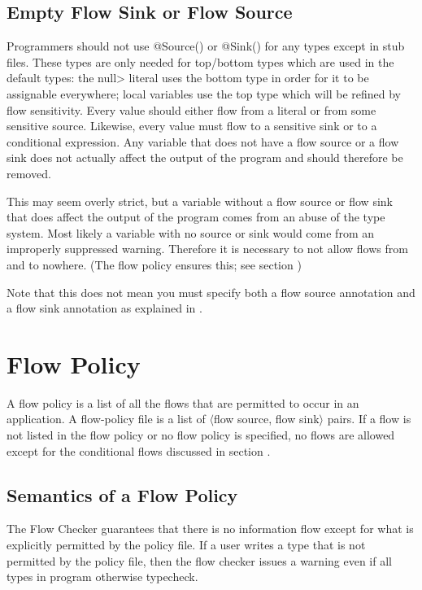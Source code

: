 \subsection{Empty Flow Sink or Flow Source\label{sec:emptyflow}}

Programmers should not use @Source(\ttcbs) or @Sink(\ttcbs) for
any types except in stub files.
These types are only needed for top/bottom types which are used in the
default types: the \<null> literal uses the bottom type in order for
it to be assignable everywhere; local variables use the top type which
will be refined by flow sensitivity.
Every value should either flow from a literal or from some sensitive
source.  Likewise, every value must flow to a sensitive sink or to a
conditional expression.  Any variable that does not have a flow source
or a flow sink does not actually affect the output of the program and
should therefore be removed.
  
This may seem overly strict, but a variable without a flow source or
flow sink that does affect the output of the program comes from an
abuse of the type system.  Most likely a variable with no source or
sink would come from an improperly suppressed warning. Therefore it is
necessary to not allow flows from and to nowhere.  (The flow policy
ensures this; see section )

Note that this does not mean you must specify both a flow source
annotation and a flow sink annotation as explained in
. 

 


\section{Flow Policy\label{sec:flow-policy}}

A flow policy is a list of all the flows that are permitted to occur in an application.
A flow-policy file is a list 
 of $\langle$flow source, flow sink$\rangle$ pairs.  If a flow is not listed in the flow policy
 or no flow policy is specified, no flows are allowed except for the conditional 
 flows discussed in section .

\subsection{Semantics of a Flow Policy}
\label{sec:undsiredflows}
The Flow Checker guarantees that there is no information
flow except for what is explicitly permitted by the policy file. If a user writes a type that is
not permitted by the policy file, then the flow checker issues a warning
even if all types in program otherwise typecheck.

